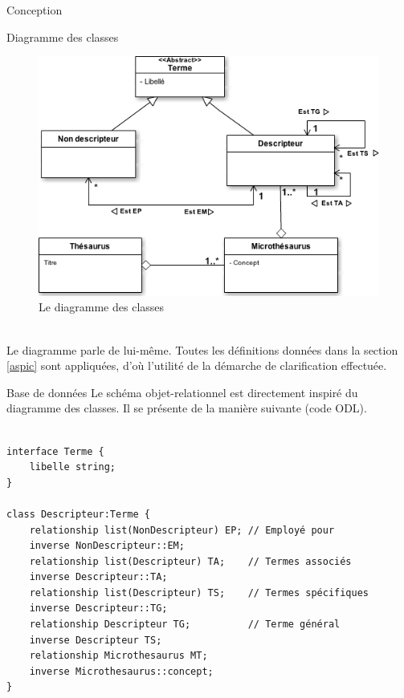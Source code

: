 \documentclass[a4paper, 12pt]{report}
\begin{document}
\begin{chapter}{Conception}
\label{tournevis}
	\begin{section}{Diagramme des classes}
		\begin{figure}[h]
			\label{classeur}
			\begin{center}
				\includegraphics[width=13cm]{Classes.png}
				\caption{Le diagramme des classes}
			\end{center}
		\end{figure}~\\
		
		Le diagramme parle de lui-même. Toutes les définitions données dans la section \ref{aspic} sont appliquées, d'où l'utilité de la démarche de clarification effectuée.\\
	\end{section}
\newpage
	\begin{section}{Base de données}
	Le schéma objet-relationnel est directement inspiré du diagramme des classes. Il se présente de la manière suivante (code ODL).\\~\\
	\begin{verbatim}
interface Terme {
	libelle string;
}

class Descripteur:Terme {
	relationship list(NonDescripteur) EP; // Employé pour
	inverse NonDescripteur::EM;
	relationship list(Descripteur) TA;    // Termes associés
	inverse Descripteur::TA;
	relationship list(Descripteur) TS;    // Termes spécifiques
	inverse Descripteur::TG;
	relationship Descripteur TG;          // Terme général
	inverse Descripteur TS;
	relationship Microthesaurus MT;
	inverse Microthesaurus::concept;
}


\end{verbatim}
\end{section}
\end{chapter}
\end{document}
